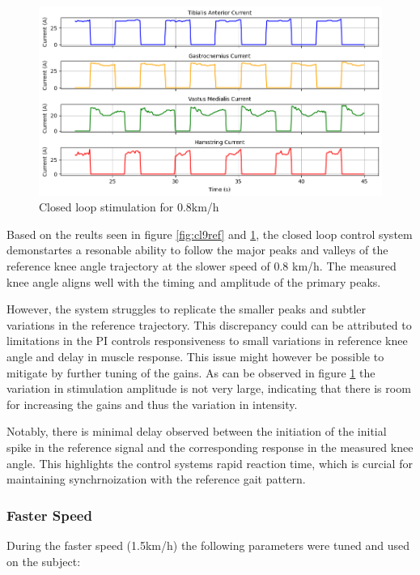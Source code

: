 \begin{figure} [H]
    \centering
    \includegraphics[width=0.9\linewidth]{images/CL9stimpng.png}
    \caption{Closed loop stimulation for 0.8km/h}
    \label{fig:cl9stim}
\end{figure}

Based on the reults seen in figure \ref{fig:cl9ref} and \ref{fig:cl9stim}, the closed loop control system demonstartes a resonable ability to follow the major peaks and valleys of the reference knee angle trajectory at the slower speed of 0.8 km/h. The measured knee angle aligns well with the timing and amplitude of the primary peaks. 

However, the system struggles to replicate the smaller peaks and subtler variations in the reference trajectory. This discrepancy could can be attributed to limitations in the PI controls responsiveness to small variations in reference knee angle and delay in muscle response. This issue might however be possible to mitigate by further tuning of the gains. As can be observed in figure \ref{fig:cl9stim} the variation in stimulation amplitude is not very large, indicating that there is room for increasing the gains and thus the variation in intensity.  

Notably, there is minimal delay observed between the initiation of the initial spike in the reference signal and the corresponding response in the measured knee angle. This highlights the control systems rapid reaction time, which is curcial for maintaining synchrnoization with the reference gait pattern.


\subsubsection{Faster Speed}
During the faster speed (1.5km/h) the following parameters were tuned and used on the subject:

